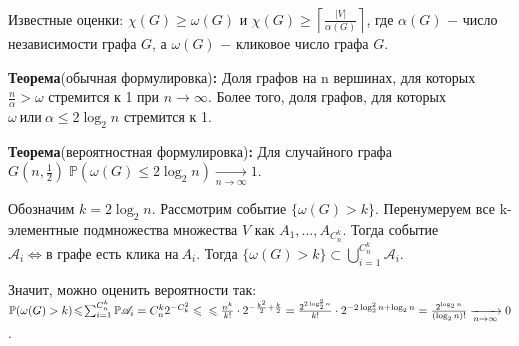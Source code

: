 Известные оценки: $\chi(G)\! \geqslant\! \omega(G)$ и $\chi(G)\! \geqslant\! \left \lceil \frac{|V|}{\alpha(G)} \right \rceil$, где $\alpha(G)$ $-$ число независимости графа $G$, а $\omega(G)$ $-$ кликовое число графа $G$.

\textbf{Теорема}(обычная формулировка)\textbf{:} Доля графов на n вершинах, для которых $\frac{n}{\alpha} > \omega$ стремится к 1 при $n\! \rightarrow\! \infty$. Более того, доля графов, для которых $\omega\: \text{или}\: \alpha\! \leqslant\! 2 \log_2 n$ стремится к 1.

\textbf{Теорема}(вероятностная формулировка)\textbf{:} Для случайного графа \\ $G(n, \frac{1}{2})\; \mathbb{P}(\omega(G) \leqslant 2 \log_2 n) \xrightarrow[n \rightarrow \infty]{} 1$.

\Proof Обозначим $k = 2\log_2 n$. Рассмотрим событие $\{\omega(G) > k \}$. Перенумеруем все k-элементные подмножества множества $V$ как $A_1, ..., A_{C^k_n}$. Тогда событие $\mathscr{A}_i \Leftrightarrow \text{в графе есть клика на}\: A_i$. Тогда $\{\omega(G) > k\} \subset \bigcup^{C^k_n}_{i=1} \mathscr{A}_i$.

Значит, можно оценить вероятности так: $\mathbb{P}(\omega(G) > k)\! \leqslant\! \sum^{C^k_n}_{i=1} \mathbb{P} \mathscr{A}_i=C^k_n 2^{-C^2_k} \leqslant \newline \leqslant \frac{n^k}{k!} \cdot 2^{-\frac{k^2}{2} + \frac{k}{2}} = \frac{2^{2 \log^2_2 n}}{k!} \cdot 2^{-2\log^2_2 n + \log_2 n} = \frac{2^{\log_2 n}}{(\log_2 n)!} \xrightarrow[n \rightarrow \infty]{} 0$. \EndProof